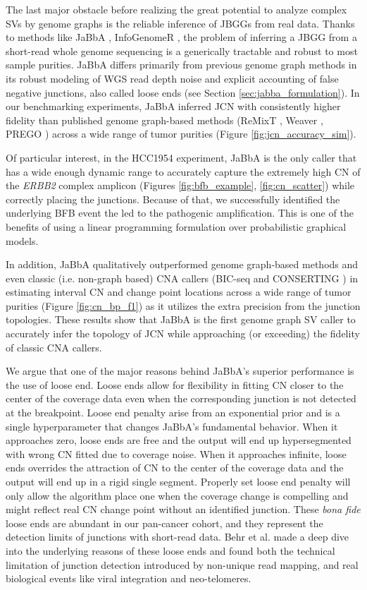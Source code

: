 \documentclass[phd,tocprelim]{cornell}
\begin{document}
The last major obstacle before realizing the great potential to analyze complex SVs by genome graphs is the reliable inference of JBGGs from real data. Thanks to methods like JaBbA \cite{Hadi2020-um}, InfoGenomeR \cite{Lee2021-rl}, the problem of inferring a JBGG from a short-read whole genome sequencing is a generically tractable and robust to most sample purities. JaBbA differs primarily from previous genome graph methods in its robust modeling of WGS read depth noise and explicit accounting of false negative junctions, also called loose ends (see Section \ref{sec:jabba_formulation}). In our benchmarking experiments, JaBbA inferred JCN with consistently higher fidelity than published genome graph-based methods (ReMixT \cite{McPherson2017-ry}, Weaver \cite{Li2016-qa}, PREGO \cite{Oesper2012-vw}) across a wide range of tumor purities (Figure \ref{fig:jcn_accuracy_sim}).

Of particular interest, in the HCC1954 experiment, JaBbA is the only caller that has a wide enough dynamic range to accurately capture the extremely high CN of the \textit{ERBB2} complex amplicon (Figures \ref{fig:bfb_example}, \ref{fig:cn_scatter}) while correctly placing the junctions. Because of that, we successfully identified the underlying BFB event the led to the pathogenic amplification. This is one of the benefits of using a linear programming formulation over probabilistic graphical models.

In addition, JaBbA qualitatively outperformed genome graph-based methods and even classic (i.e. non-graph based) CNA callers (BIC-seq \cite{Xi2011-oa} and CONSERTING \cite{Chen2015-sw}) in estimating interval CN and change point locations across a wide range of tumor purities (Figure \ref{fig:cn_bp_f1}) as it utilizes the extra precision from the junction topologies. These results show that JaBbA is the first genome graph SV caller to accurately infer the topology of JCN while approaching (or exceeding) the fidelity of classic CNA callers.

We argue that one of the major reasons behind JaBbA's superior performance is the use of loose end. Loose ends allow for flexibility in fitting CN closer to the center of the coverage data even when the corresponding junction is not detected at the breakpoint. Loose end penalty \textlambda arise from an exponential prior and is a single hyperparameter that changes JaBbA's fundamental behavior. When it approaches zero, loose ends are free and the output will end up hypersegmented with wrong CN fitted due to coverage noise. When it approaches infinite, loose ends overrides the attraction of CN to the center of the coverage data and the output will end up in a rigid single segment. Properly set loose end penalty will only allow the algorithm place one when the coverage change is compelling and might reflect real CN change point without an identified junction. These \textit{bona fide} loose ends are abundant in our pan-cancer cohort, and they represent the detection limits of junctions with short-read data. Behr et al. \cite{Behr2021-gf} made a deep dive into the underlying reasons of these loose ends and found both the technical limitation of junction detection introduced by non-unique read mapping, and real biological events like viral integration and neo-telomeres.
\end{document}
